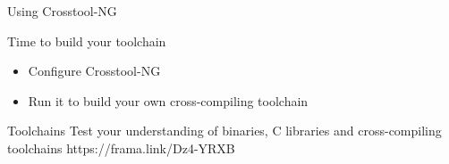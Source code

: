 \setuplabframe
{Using Crosstool-NG}
{
  Time to build your toolchain
  \begin{itemize}
  \item Configure Crosstool-NG
  \item Run it to build your own cross-compiling toolchain
  \end{itemize}
}

\quizframe
{Toolchains}
{Test your understanding of binaries, C libraries and cross-compiling toolchains}
{https://frama.link/Dz4-YRXB}

